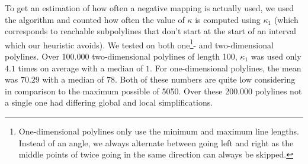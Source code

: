 To get an estimation of how often a negative mapping is actually used, we used the \citeauthor{polyline_simplification_has_cubic_complexity_bringmannetal} algorithm and counted how often the value of \(\kappa\) is computed using \(\kappa_1\) (which corresponds to reachable subpolylines that don't start at the start of an interval which our heuristic avoids). We tested on both one\footnote{One-dimensional polylines only use the minimum and maximum line lengths. Instead of an angle, we always alternate between going left and right as the middle points of twice going in the same direction can always be skipped.}- and two-dimensional polylines. Over 100.000 two-dimensional polylines of length 100, \(\kappa_1\) was used only \(4.1\) times on average with a median of \(1\). For one-dimensional polylines, the mean was \(70.29\) with a median of \(78\). Both of these numbers are quite low considering in comparison to the maximum possible of 5050. Over these 200.000 polylines not a single one had differing global and local simplifications. 
